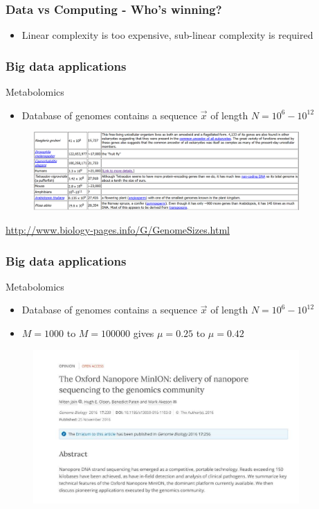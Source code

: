 \documentclass[10pt,xcolor=table]{beamer}
\begin{document}
\begin{frame}\frametitle{Data vs Computing - Who's winning?}

\pause
\begin{itemize}
\item Linear complexity is too expensive, sub-linear complexity is required
\end{itemize}

\end{frame}
\begin{frame}\frametitle{Big data applications}
\begin{block}{Metabolomics}
\begin{itemize}
  \item Database of genomes contains a sequence $\vec{x}$ of length $N=10^{6}-10^{12}$
\end{itemize}

\end{block}
  \begin{figure}[h]
  \includegraphics[width=4.0in]{genomesizes}
  \end{figure}

\url{http://www.biology-pages.info/G/GenomeSizes.html}
\end{frame}
\begin{frame}\frametitle{Big data applications}
\begin{block}{Metabolomics}
\begin{itemize}
  \item Database of genomes contains a sequence $\vec{x}$ of length $N=10^{6}-10^{12}$
  \item $M=1000$ to $M = 100000$ gives $\mu = 0.25$ to $\mu = 0.42$
\end{itemize}

  \begin{figure}[h]
  \includegraphics[width=4.0in]{genomebiology}
  \end{figure}


\end{block}

\end{frame}
\end{document}
